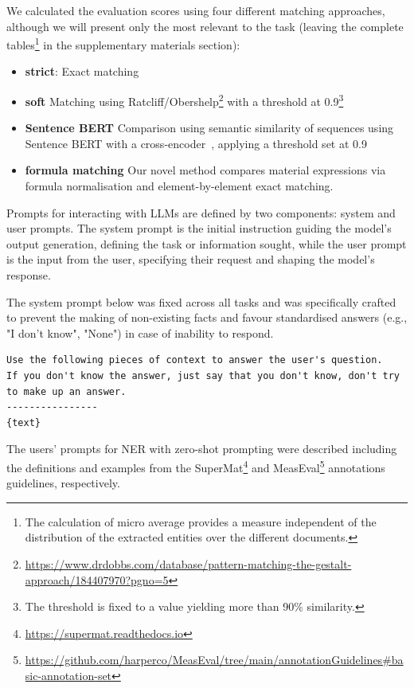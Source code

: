 We calculated the evaluation scores using four different matching approaches, although we will present only the most relevant to the task (leaving the complete tables\footnote{The calculation of micro average provides a measure independent of the distribution of the extracted entities over the different documents.} in the supplementary materials section): 
\begin{itemize}
    \item \textbf{strict}: Exact matching
    \item \textbf{soft} Matching using Ratcliff/Obershelp\footnote{\url{https://www.drdobbs.com/database/pattern-matching-the-gestalt-approach/184407970?pgno=5}} with a threshold at 0.9\footnote{\label{ref:threshold}The threshold is fixed to a value yielding more than 90\% similarity.}
    \item \textbf{Sentence BERT} Comparison using semantic similarity of sequences using Sentence BERT with a cross-encoder~\cite{reimers2019sentencebert}, applying a threshold set at 0.9
    \item \textbf{formula matching} Our novel method compares material expressions via formula normalisation and element-by-element exact matching.
\end{itemize}

Prompts for interacting with LLMs are defined by two components: system and user prompts. 
The system prompt is the initial instruction guiding the model's output generation, defining the task or information sought, while the user prompt is the input from the user, specifying their request and shaping the model's response.

The system prompt below was fixed across all tasks and was specifically crafted to prevent the making of non-existing facts and favour standardised answers (e.g., "I don't know", "None") in case of inability to respond.

\begin{lstlisting}[caption=Generic system prompt common to all requests]
Use the following pieces of context to answer the user's question. 
If you don't know the answer, just say that you don't know, don't try to make up an answer. 
----------------
{text}
\end{lstlisting}

The users' prompts for NER with zero-shot prompting were described including the definitions and examples from the SuperMat\footnote{\url{https://supermat.readthedocs.io}} and MeasEval\footnote{\url{https://github.com/harperco/MeasEval/tree/main/annotationGuidelines\#basic-annotation-set}} annotations guidelines, respectively.  

